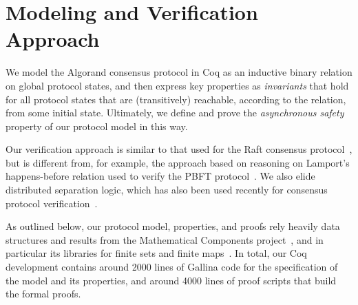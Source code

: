 \section{Modeling and Verification Approach}
\label{sec:approach}

We model the Algorand consensus protocol in Coq as an inductive binary relation on global protocol states, and then express key properties as \emph{invariants} that hold for all protocol states that are (transitively) reachable, according to the relation, from some initial state. Ultimately, we define and prove the \emph{asynchronous safety} property of our protocol model in this way.

Our verification approach is similar to that used for the Raft consensus protocol~\cite{Woos2016}, but is different from, for example, the approach based on reasoning on Lamport's happens-before relation used to verify the PBFT protocol~\cite{Rahli2018}. We also elide distributed separation logic, which has also been used recently for consensus protocol verification~\cite{Sergey2018}.

As outlined below, our protocol model, properties, and proofs rely heavily data structures and results from the Mathematical Components project~\cite{MathComp}, and in particular its libraries for finite sets and finite maps~\cite{Cohen2019}. In total, our Coq development contains around 2000 lines of Gallina code for the specification of the model and its properties, and around 4000 lines of proof scripts that build the formal proofs.

